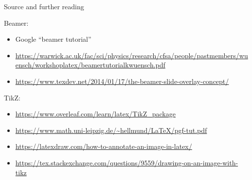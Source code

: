\documentclass[8pt]{beamer}\usepackage[]{graphicx}\usepackage[]{color}
\begin{document}
\begin{frame}{Source and further reading}

Beamer:
{\tiny
\begin{itemize}
\item Google ``beamer tutorial''
\item \url{https://warwick.ac.uk/fac/sci/physics/research/cfsa/people/pastmembers/wuensch/workshoplatex/beamertutorialkwuensch.pdf}
\item \url{https://www.texdev.net/2014/01/17/the-beamer-slide-overlay-concept/}\\
\end{itemize}
}

TikZ:
{\tiny
\begin{itemize}
\item \url{https://www.overleaf.com/learn/latex/TikZ_package}
\item \url{https://www.math.uni-leipzig.de/~hellmund/LaTeX/pgf-tut.pdf}
\item \url{https://latexdraw.com/how-to-annotate-an-image-in-latex/}
\item \url{https://tex.stackexchange.com/questions/9559/drawing-on-an-image-with-tikz}
\end{itemize}
}

\end{frame}
\end{document}
